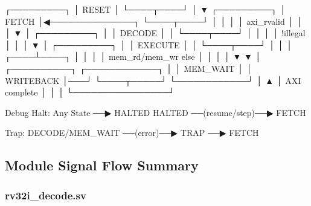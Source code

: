 \begin{record}

\begin{logblock}
                    ┌─────────┐
                    │  RESET  │
                    └────┬────┘
                         │
                         ▼
                    ┌─────────┐
                    │  FETCH  │◀──────────────┐
                    └────┬────┘               │
                         │                    │
                         │ axi_rvalid         │
                         │                    │
                         ▼                    │
                    ┌─────────┐               │
                    │ DECODE  │               │
                    └────┬────┘               │
                         │                    │
                         │ !illegal           │
                         │                    │
                         ▼                    │
                    ┌─────────┐               │
                    │ EXECUTE │               │
                    └────┬────┘               │
                         │                    │
                    ┌────┴────┐               │
                    │         │               │
         mem_rd/mem_wr       else             │
                    │         │               │
                    ▼         ▼               │
              ┌──────────┐  ┌────────────┐   │
              │ MEM_WAIT │  │ WRITEBACK  │───┘
              └────┬─────┘  └────────────┘
                   │                ▲
                   │ AXI complete   │
                   │                │
                   └────────────────┘

         Debug Halt:
              Any State ──▶ HALTED
              HALTED ──(resume/step)──▶ FETCH

         Trap:
              DECODE/MEM_WAIT ──(error)──▶ TRAP ──▶ FETCH
\end{logblock}

\end{record}

\subsection{Module Signal Flow Summary}\label{cr:fix:cpu-dataflow-diagram:module-signal-flow-summary}

\subsubsection{\texorpdfstring{rv32i\_\allowbreak{}decode.sv}{rv32i\_decode.sv}}\label{cr:fix:cpu-dataflow-diagram:rv32i-decodesv}

